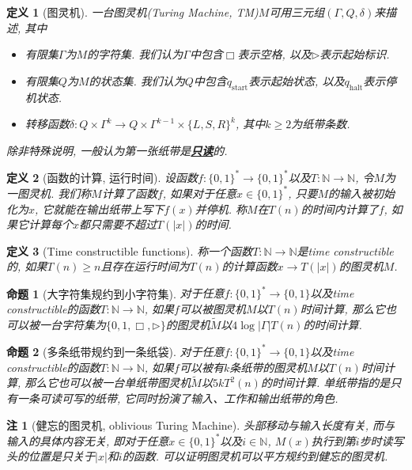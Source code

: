 \documentclass[8pt]{article}
\theoremstyle{compact}
\newtheorem{definition}{定义}
\newtheorem{proposition}{命题}
\newtheorem{remark}{注}
\def\obj#1{\textbf{\uline{#1}}}
\def\ge{\geqslant}
\begin{document}
\begin{definition}[图灵机]
	一台图灵机(Turing Machine, TM)$M$可用三元组$(\Gamma, Q, \delta)$来描述, 其中
	\begin{itemize}
		\item 有限集$\Gamma$为$M$的字符集. 我们认为$\Gamma$中包含$\Box$表示空格, 以及$\triangleright$表示起始标识. 
		\item 有限集$Q$为$M$的状态集. 我们认为$Q$中包含$q_{\text{start}}$表示起始状态, 以及$q_{\text{halt}}$表示停机状态. 
		\item 转移函数$\delta: Q \times \Gamma^{k} \to Q \times \Gamma^{k-1} \times \{L, S, R\}^{k}$, 其中$k \ge 2$为纸带条数. 
	\end{itemize}
	除非特殊说明, 一般认为第一张纸带是\obj{只读}的. 
\end{definition}
\begin{definition}[函数的计算, 运行时间]
	设函数$f: \{0,  1\}^* \to \{0, 1\}^*$以及$T: \mathbb{N} \to \mathbb{N}$, 令$M$为一图灵机. 我们称$M$计算了函数$f$, 如果对于任意$x \in \{0, 1\}^*$, 只要$M$的输入被初始化为$x$, 它就能在输出纸带上写下$f(x)$并停机. 称$M$在$T(n)$的时间内计算了$f$, 如果它计算每个$x$都只需要不超过$T(|x|)$的时间. 
\end{definition}
\begin{definition}[Time constructible functions]
	称一个函数$T: \mathbb N \to \mathbb N$是time constructible的, 如果$T(n) \ge n$且存在运行时间为$T(n)$的计算函数$x \to T(|x|)$的图灵机$M$. 
\end{definition}
\begin{proposition}[大字符集规约到小字符集]
	对于任意$f: \{0, 1\}^* \to \{0, 1\}$以及time constructible的函数$T: \mathbb{N} \to \mathbb{N}$, 如果$f$可以被图灵机$M$以$T(n)$时间计算, 那么它也可以被一台字符集为$\{0, 1, \Box, \triangleright\}$的图灵机$\tilde{M}$以$4\log |\Gamma|T(n)$的时间计算. 
\end{proposition}
\begin{proposition}[多条纸带规约到一条纸袋]
	对于任意$f: \{0, 1\}^* \to \{0, 1\}$以及time constructible的函数$T: \mathbb{N} \to \mathbb{N}$, 如果$f$可以被有$k$条纸带的图灵机$M$以$T(n)$时间计算, 那么它也可以被一台单纸带图灵机$\tilde{M}$以$5kT^2(n)$的时间计算. 单纸带指的是只有一条可读可写的纸带, 它同时扮演了输入、工作和输出纸带的角色. 
\end{proposition}
\begin{remark}[健忘的图灵机, oblivious Turing Machine]
	头部移动与输入长度有关, 而与输入的具体内容无关, 即对于任意$x \in \{0, 1\}^*$以及$i \in \mathbb N$, $M(x)$执行到第$i$步时读写头的位置是只关于$|x|$和$i$的函数. 可以证明图灵机可以平方规约到健忘的图灵机. 
\end{remark}
\end{document}
